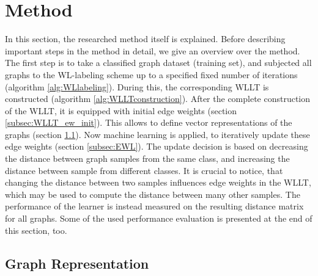 \section{Method} \label{sec:method}

In this section, the researched method itself is explained.
Before describing important steps in the method in detail, we give an overview over the method.
The first step is to take a classified graph dataset (training set), and subjected all graphs to the WL-labeling scheme up to a specified fixed number of iterations (algorithm \ref{alg:WLlabeling}).
During this, the corresponding WLLT is constructed (algorithm \ref{alg:WLLTconstruction}).
After the complete construction of the WLLT, it is equipped with initial edge weights (section \ref{subsec:WLLT_ew_init}).
This allows to define vector representations of the graphs (section \ref{subsec:graph_representation}).
Now machine learning is applied, to iteratively update these edge weights (section \ref{subsec:EWL}).
The update decision is based on decreasing the distance between graph samples from the same class, and increasing the distance between sample from different classes.
It is crucial to notice, that changing the distance between two samples influences edge weights in the WLLT, which may be used to compute the distance between many other samples.
The performance of the learner is instead measured on the resulting distance matrix for all graphs.
Some of the used performance evaluation is presented at the end of this section, too.

\subsection{Graph Representation} \label{subsec:graph_representation}

